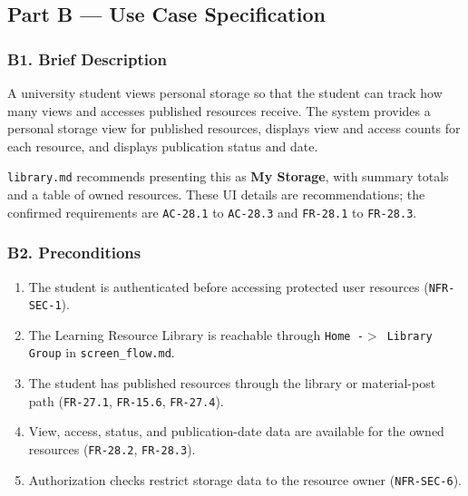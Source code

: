 \documentclass[12pt]{article}
\begin{document}
\hypertarget{sec:part-b-use-case-specification}{}
\subsection*{Part B --- Use Case Specification}
\par\medskip

\hypertarget{sec:b1-brief-description}{}
\subsubsection*{B1. Brief Description}
\par\medskip

A university student views personal storage so that the student can track how many views and accesses published resources receive. The system provides a personal storage view for published resources, displays view and access counts for each resource, and displays publication status and date.
\par\medskip

\texttt{library.md} recommends presenting this as \textbf{My Storage}, with summary totals and a table of owned resources. These UI details are recommendations; the confirmed requirements are \texttt{AC-28.1} to \texttt{AC-28.3} and \texttt{FR-28.1} to \texttt{FR-28.3}.
\par\medskip

\hypertarget{sec:b2-preconditions}{}
\subsubsection*{B2. Preconditions}
\par\medskip

\begin{enumerate}
\item The student is authenticated before accessing protected user resources (\texttt{NFR-SEC-1}).
\item The Learning Resource Library is reachable through \texttt{Home -$>$ Library Group} in \texttt{screen\_flow.md}.
\item The student has published resources through the library or material-post path (\texttt{FR-27.1}, \texttt{FR-15.6}, \texttt{FR-27.4}).
\item View, access, status, and publication-date data are available for the owned resources (\texttt{FR-28.2}, \texttt{FR-28.3}).
\item Authorization checks restrict storage data to the resource owner (\texttt{NFR-SEC-6}).
\end{enumerate}
\par\medskip
\end{document}
